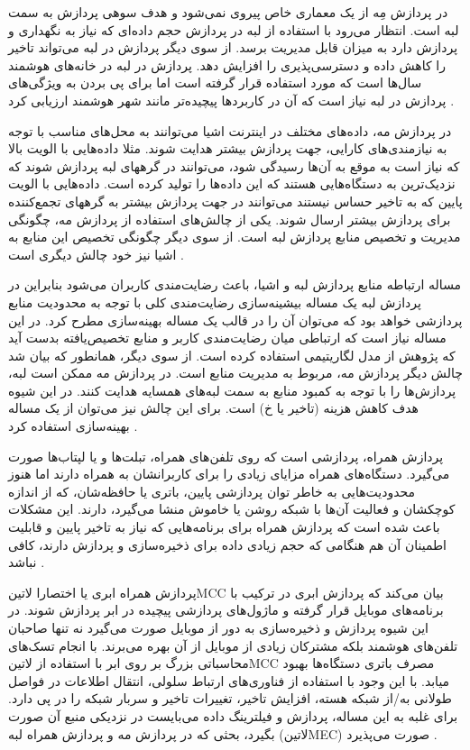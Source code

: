 در پردازش مِه از یک معماری خاص پیروی نمی‌شود و هدف سوهی پردازش به سمت لبه است. انتظار می‌رود با استفاده از لبه در پردازش حجم داده‌ای که نیاز به نگهداری و پردازش دارد به میزان قابل مدیریت برسد.
از سوی دیگر پردازش در لبه می‌تواند تاخیر را کاهش داده و دسترسی‌پذیری را افزایش دهد. پردازش در لبه در خانه‌های هوشمند سال‌ها است که مورد استفاده قرار گرفته است اما برای پی بردن به ویژگی‌های پردازش در لبه
نیاز است که آن در کاربردها پیچیده‌تر مانند شهر هوشمند ارزیابی کرد
.

در پردازش مه، داده‌های مختلف در اینترنت اشیا می‌توانند به محل‌های مناسب با توجه به نیازمندی‌های کارایی، جهت پردازش بیشتر هدایت شوند. مثلا داده‌هایی با الویت بالا که نیاز است به موقع به آن‌ها رسیدگی شود،
می‌توانند در گرههای لبه پردازش شوند که نزدیک‌ترین به دستگاه‌هایی هستند که این داده‌ها را تولید کرده است. داده‌هایی با الویت پایین که به تاخیر حساس نیستند می‌توانند در جهت پردازش بیشتر به گرههای تجمع‌کننده
برای پردازش بیشتر ارسال شوند.
یکی از چالش‌های استفاده از پردازش مه، چگونگی مدیریت و تخصیص منابع پردازش لبه است. از سوی دیگر چگونگی تخصیص این منابع به اشیا نیز خود چالش دیگری است
.

مساله ارتباطه منابع پردازش لبه و اشیا، باعث رضایت‌مندی کاربران می‌شود بنابراین در پردازش لبه یک مساله بیشینه‌سازی رضایت‌مندی کلی با توجه به محدودیت منابع پردازشی خواهد بود
که می‌توان آن را در قالب یک مساله بهینه‌سازی مطرح کرد. در این مساله نیاز است که ارتباطی میان رضایت‌مندی کاربر و منابع تخصیص‌یافته بدست آید که پژوهش  از مدل
لگاریتیمی استفاده کرده است.
از سوی دیگر، همانطور که بیان شد چالش دیگر پردازش مه، مربوط به مدیریت منابع است. در پردازش مه ممکن است لبه‌، پردازش‌ها را با توجه به کمبود منابع به سمت لبه‌های همسایه هدایت کنند.
در این شیوه هدف کاهش هزینه (تاخیر یا ‌خ) است. برای این چالش نیز می‌توان از یک مساله بهینه‌سازی استفاده کرد
.


پردازش همراه، پردازشی است که روی تلفن‌های همراه، تبلت‌ها و یا لپتاب‌ها صورت می‌گیرد. دستگاه‌های همراه مزایای زیادی را برای کاربرانشان به همراه دارند اما هنوز
محدودیت‌هایی به خاطر توان پردازشی پایین، باتری یا حافظه‌شان، که از اندازه کوچکشان و فعالیت آن‌ها با شبکه روشن یا خاموش منشا می‌گیرد، دارند.
این مشکلات باعث شده است که پردازش همراه برای برنامه‌هایی که نیاز به تاخیر پایین و قابلیت اطمینان آن هم هنگامی که حجم زیادی داده برای ذخیره‌سازی و پردازش دارند، کافی نباشد
.


پردازش همراه ابری یا اختصارا ‌لاتین{MCC} بیان می‌کند که پردازش ابری در ترکیب با برنامه‌های موبایل قرار گرفته و ماژول‌های پردازشی پیچیده در ابر پردازش شوند.
در این شیوه پردازش و ذخیره‌سازی به دور از موبایل صورت می‌گیرد نه تنها صاحبان تلفن‌های هوشمند بلکه مشترکان زیادی از موبایل از آن بهره می‌برند.
با انجام تسک‌های محاسباتی بزرگ بر روی ابر با استفاده از ‌لاتین{MCC} مصرف باتری دستگاه‌ها بهبود میابد.
با این وجود با استفاده از فناوری‌های ارتباط سلولی، انتقال اطلاعات در فواصل طولانی به/از شبکه هسته، افزایش تاخیر، تغییرات تاخیر و سربار شبکه را در پی دارد.
برای غلبه به این مساله، پردازش و فیلترینگ داده می‌بایست در نزدیکی منبع آن صورت بگیرد، بحثی که در پردازش مه و پردازش همراه لبه (‌لاتین{MEC}) صورت می‌پذیرد
.

